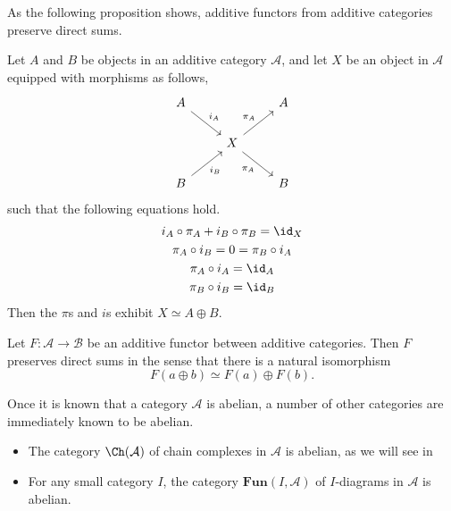 \documentclass[main.tex]{subfiles}
\begin{document}
As the following proposition shows, additive functors from additive categories preserve direct sums.
\begin{lemma}
  \label{lemma:conditions_for_direct_sum}
  Let $A$ and $B$ be objects in an additive category $\mathcal{A}$, and let $X$ be an object in $\mathcal{A}$ equipped with morphisms as follows,
  \begin{equation*}
    \begin{tikzcd}
      A
      \arrow[dr, "i_{A}"]
      && A
      \\
      & X
      \arrow[ur, "\pi_{A}"]
      \arrow[dr, swap, "\pi_{A}"]
      \\
      B
      \arrow[ur, swap, "i_{B}"]
      && B
    \end{tikzcd}
  \end{equation*}
  such that the following equations hold.
  \begin{gather*}
    i_{A} \circ \pi_{A} + i_{B} \circ \pi_{B} = \id_{X} \\
    \pi_{A} \circ i_{B} = 0 = \pi_{B} \circ i_{A} \\
    \pi_{A} \circ i_{A} = \id_{A} \\
    \pi_{B} \circ i_{B} = \id_{B} \\
  \end{gather*}
  Then the $\pi$s and $i$s exhibit $X \simeq A \oplus B$.
\end{lemma}

\begin{corollary}
  Let $F\colon \mathcal{A} \to \mathcal{B}$ be an additive functor between additive categories. Then $F$ preserves direct sums in the sense that there is a natural isomorphism
  \begin{equation*}
    F(a \oplus b) \simeq F(a) \oplus F(b).
  \end{equation*}
\end{corollary}

Once it is known that a category $\mathcal{A}$ is abelian, a number of other categories are immediately known to be abelian.
\begin{itemize}
  \item The category $\Ch(\mathcal{A})$ of chain complexes in $\mathcal{A}$ is abelian, as we will see in

  \item For any small category $I$, the category $\mathbf{Fun}(I, \mathcal{A})$ of $I$-diagrams in $\mathcal{A}$ is abelian.
\end{itemize}
\end{document}
